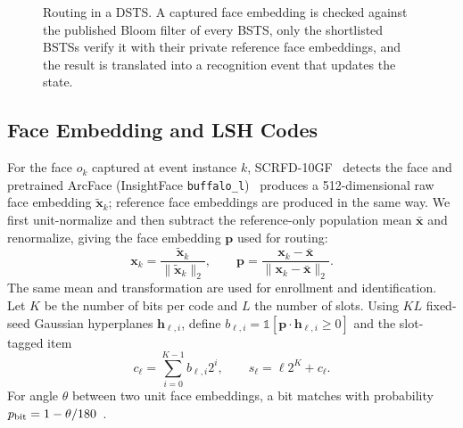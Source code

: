 \documentclass[pdflatex,sn-mathphys-num]{sn-jnl}%
\providecommand{\code}[1]{\texttt{#1}}%
\theoremstyle{thmstyleone}%
\theoremstyle{thmstyletwo}%
\theoremstyle{thmstylethree}%
\begin{document}
\begin{figure}[!t]
\centering
\small
{}
\caption{Routing in a DSTS. A captured face embedding is checked against the published Bloom filter of every BSTS, only the shortlisted BSTSs verify it with their private reference face embeddings, and the result is translated into a recognition event that updates the state.}
\label{fig:arch}
\end{figure}

\subsection{Face Embedding and LSH Codes}
For the face $o_k$ captured at event instance $k$, SCRFD-10GF~\cite{guo2022} detects the face and pretrained ArcFace (InsightFace \code{buffalo\_l})~\cite{deng2019} produces a 512-dimensional raw face embedding $\tilde{\mathbf{x}}_k$; reference face embeddings are produced in the same way. We first unit-normalize and then subtract the reference-only population mean $\bar{\mathbf{x}}$ and renormalize, giving the face embedding $\mathbf{p}$ used for routing:
\begin{equation}
\mathbf{x}_k=\frac{\tilde{\mathbf{x}}_k}{\|\tilde{\mathbf{x}}_k\|_2},\qquad
\mathbf{p}=\frac{\mathbf{x}_k-\bar{\mathbf{x}}}{\|\mathbf{x}_k-\bar{\mathbf{x}}\|_2}.
\label{eq:preprocess}
\end{equation}
The same mean and transformation are used for enrollment and identification. Let $K$ be the number of bits per code and $L$ the number of slots. Using $KL$ fixed-seed Gaussian hyperplanes $\mathbf{h}_{\ell,i}$, define $b_{\ell,i}=\mathbb{1}[\mathbf{p}\cdot\mathbf{h}_{\ell,i}\geq0]$ and the slot-tagged item
\begin{equation}
c_\ell=\sum_{i=0}^{K-1}b_{\ell,i}2^i,\qquad s_\ell=\ell2^K+c_\ell.
\label{eq:lsh-code}
\end{equation}
For angle $\theta$ between two unit face embeddings, a bit matches with probability $p_{\rm bit}=1-\theta/180$~\cite{charikar2002}.
\end{document}
